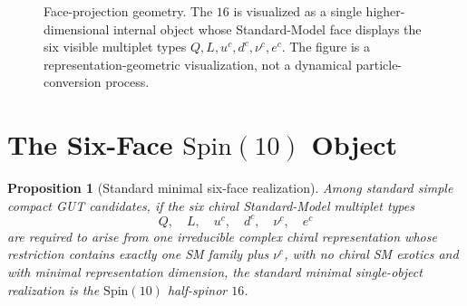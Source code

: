 \documentclass[
  aps,
  prd,
  preprint,
  nofootinbib,
  superscriptaddress,
  longbibliography
]{revtex4-2}
\newcommand{\Spin}{\mathrm{Spin}}
\DeclareMathOperator{\Res}{Res}
\newtheorem{proposition}[theorem]{Proposition}
\begin{document}
\begin{figure}[t]
\caption{Face-projection geometry.  The \(16\) is visualized as a single
higher-dimensional internal object whose Standard-Model face displays the six
visible multiplet types \(Q,L,u^c,d^c,\nu^c,e^c\).  The figure is a
representation-geometric visualization, not a dynamical particle-conversion
process.}
\label{fig:face-projection}
\end{figure}

\section{\texorpdfstring{The Six-Face \(\Spin(10)\) Object}{The Six-Face Spin(10) Object}}

\begin{proposition}[Standard minimal six-face realization]
Among standard simple compact GUT candidates, if the six chiral
Standard-Model multiplet types
\[
  Q,\quad L,\quad u^c,\quad d^c,\quad \nu^c,\quad e^c
\]
are required to arise from one irreducible complex chiral representation whose
restriction contains exactly one SM family plus \(\nu^c\), with no chiral SM
exotics and with minimal representation dimension, the standard minimal
single-object realization is the \(\Spin(10)\) half-spinor \(16\).
\end{proposition}
\end{document}
